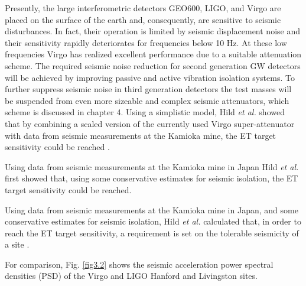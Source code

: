 Presently, the large interferometric detectors GEO600, LIGO, and Virgo are placed on the surface of the earth and, consequently, are sensitive to seismic disturbances. In fact, their operation is limited by seismic displacement noise and their sensitivity rapidly deteriorates for frequencies below 10 Hz. At these low frequencies Virgo has realized excellent performance due to a suitable attenuation scheme. The required seismic noise reduction for second generation GW detectors will be achieved by improving passive and active vibration isolation systems. To further suppress seismic noise in third generation detectors the test masses will be suspended from even more sizeable and complex seismic attenuators, which scheme is discussed in chapter 4. Using a simplistic model, Hild \emph{et al.} showed that by combining a scaled version of the currently used Virgo super-attenuator with data from seismic measurements at the Kamioka mine, the ET target sensitivity could be reached \cite{HildETconventional}. 

Using data from seismic measurements at the Kamioka mine in Japan Hild \emph{et al.} first showed that, using some conservative estimates for seismic isolation, the ET target sensitivity could be reached. 

Using data from seismic measurements at the Kamioka mine in Japan, and some conservative estimates for seismic isolation, Hild \emph{et al.} calculated that, in order to reach the ET target sensitivity, a requirement is set on the tolerable seismicity of a site \cite{HildETconventional}. 

For comparison, Fig. \ref{fig3.2} shows the seismic acceleration power spectral densities (PSD) of the Virgo and LIGO Hanford and Livingston sites. 

